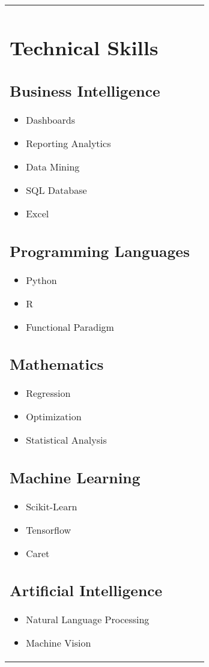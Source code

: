 \documentclass{article}
\begin{document}
\begin{tabular*}{7.5in}{ l | l}
	\begin{minipage}[t]{2.0in}
	\section*{Technical Skills}
	\subsection*{Business Intelligence}
	\begin{itemize}[noitemsep]
		\item Dashboards
		\item Reporting Analytics
		\item Data Mining
		\item SQL Database
		\item Excel
	\end{itemize}
	\subsection*{Programming Languages}	
	\begin{itemize}[noitemsep]
		\item Python
		\item R
		\item Functional Paradigm
	\end{itemize}
	\subsection*{Mathematics}
	\begin{itemize}[noitemsep]
		\item Regression
		\item Optimization 
		\item Statistical Analysis
	\end{itemize}
	\subsection*{Machine Learning}
	\begin{itemize}[noitemsep]
		\item Scikit-Learn	
		\item Tensorflow
		\item Caret
	\end{itemize}
	\subsection*{Artificial Intelligence}
	\begin{itemize}[noitemsep]
		\item Natural Language Processing
		\item Machine Vision
	\end{itemize}

\end{minipage}
\end{tabular*}
\end{document}
